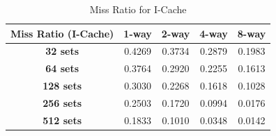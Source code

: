 \documentclass{article}
\begin{document}
\begin{table}[h]
	\centering
	\begin{tabular}{|c|c|c|c|c|}
		\hline
		\textbf{Miss Ratio (I-Cache)} & \textbf{1-way} & \textbf{2-way} & \textbf{4-way} & \textbf{8-way} \\ \hline
		\textbf{32 sets}  &       0.4269      &       0.3734     &      0.2879       &       0.1983      \\ \hline
		\textbf{64 sets}  &        0.3764    &       0.2920     &       0.2255      &      0.1613      \\ \hline
		\textbf{128 sets} &       0.3030      &       0.2268     &        0.1618    &      0.1028       \\ \hline
		\textbf{256 sets} &        0.2503     &      0.1720       &      0.0994       &       0.0176      \\ \hline
		\textbf{512 sets} &       0.1833     &      0.1010      &       0.0348      &      0.0142      \\ \hline
	\end{tabular}
	\caption{Miss Ratio for I-Cache}
	\label{tab:I1-Cache}
\end{table}



	
\end{document}
